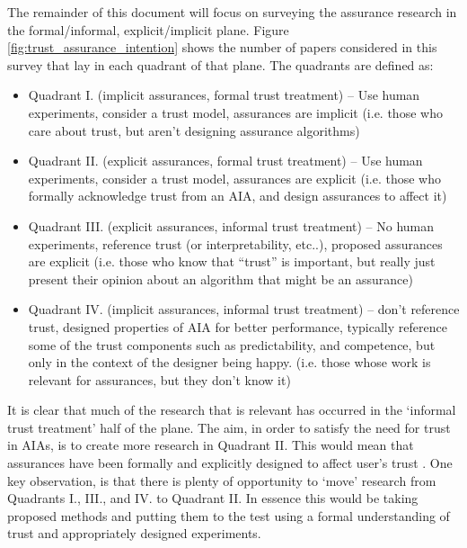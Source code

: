 The remainder of this document will focus on surveying the assurance research in the formal/informal, explicit/implicit plane. Figure \ref{fig:trust_assurance_intention} shows the number of papers considered in this survey that lay in each quadrant of that plane. The quadrants are defined as:

\begin{itemize}
    \item Quadrant I. (implicit assurances, formal trust treatment) -- Use human experiments, consider a trust model, assurances are implicit (i.e. those who care about trust, but aren't designing assurance algorithms)
    \item Quadrant II. (explicit assurances, formal trust treatment) -- Use human experiments, consider a trust model, assurances are explicit (i.e. those who formally acknowledge trust from an AIA, and design assurances to affect it)
    \item Quadrant III. (explicit assurances, informal trust treatment) -- No human experiments, reference trust (or interpretability, etc..), proposed assurances are explicit (i.e. those who know that ``trust'' is important, but really just present their opinion about an algorithm that might be an assurance)
    \item Quadrant IV. (implicit assurances, informal trust treatment) -- don't reference trust, designed properties of AIA for better performance, typically reference some of the trust components such as predictability, and competence, but only in the context of the designer being happy. (i.e. those whose work is relevant for assurances, but they don't know it)
\end{itemize}

It is clear that much of the research that is relevant has occurred in the `informal trust treatment' half of the plane. The aim, in order to satisfy the need for trust in AIAs, is to create more research in Quadrant II.  This would mean that assurances have been formally and explicitly designed to affect user's trust . 
One key observation, is that there is plenty of opportunity to `move' research from Quadrants I., III., and IV. to Quadrant II. In essence this would be taking proposed methods and putting them to the test using a formal understanding of trust and appropriately designed experiments.





